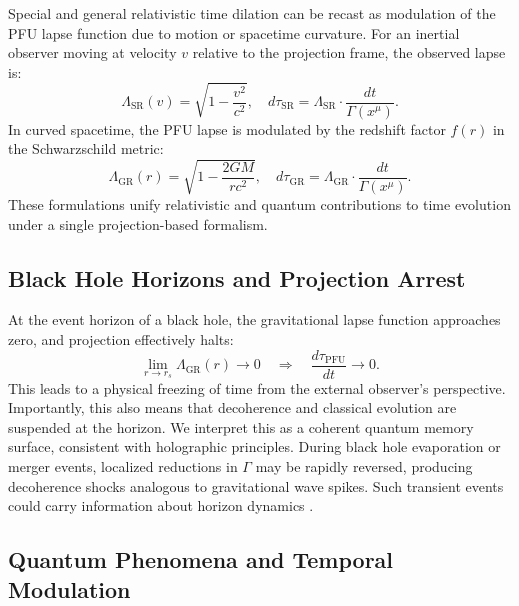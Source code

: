 \documentclass[12pt,a4paper]{article}
\numberwithin{equation}{section}
\begin{document}
Special and general relativistic time dilation can be recast as modulation of the PFU lapse function due to motion or spacetime curvature. For an inertial observer moving at velocity $v$ relative to the projection frame, the observed lapse is:
\begin{equation}
\label{eq:pfu_rel}
\Lambda_{\text{SR}}(v) = \sqrt{1 - \frac{v^2}{c^2}}, \quad d\tau_{\text{SR}} = \Lambda_{\text{SR}} \cdot \frac{dt}{\Gamma(x^\mu)}.
\end{equation}
In curved spacetime, the PFU lapse is modulated by the redshift factor $f(r)$ in the Schwarzschild metric:
\begin{equation}
\label{eq:pfu_gr}
\Lambda_{\text{GR}}(r) = \sqrt{1 - \frac{2GM}{rc^2}}, \quad d\tau_{\text{GR}} = \Lambda_{\text{GR}} \cdot \frac{dt}{\Gamma(x^\mu)}.
\end{equation}
These formulations unify relativistic and quantum contributions to time evolution under a single projection-based formalism.

\subsection{Black Hole Horizons and Projection Arrest}

At the event horizon of a black hole, the gravitational lapse function approaches zero, and projection effectively halts:
\begin{equation}
\label{eq:bh_freeze}
\lim_{r \to r_s} \Lambda_{\text{GR}}(r) \to 0 \quad \Rightarrow \quad \frac{d\tau_{\text{PFU}}}{dt} \to 0.
\end{equation}
This leads to a physical freezing of time from the external observer’s perspective. Importantly, this also means that decoherence and classical evolution are suspended at the horizon. We interpret this as a coherent quantum memory surface, consistent with holographic principles. During black hole evaporation or merger events, localized reductions in $\Gamma$ may be rapidly reversed, producing decoherence shocks analogous to gravitational wave spikes. Such transient events could carry information about horizon dynamics \cite{barcelo_laboratory_2011}.

\subsection{Quantum Phenomena and Temporal Modulation}
\end{document}
